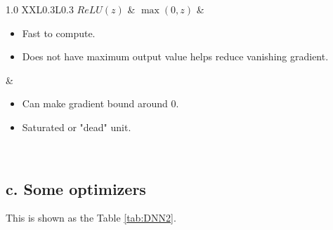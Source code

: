 \begin{table}[ht!]
\begin{tabularx}{1.0\textwidth}{ XXL{0.3\textwidth}L{0.3\textwidth} }
	$ReLU(z)$ & $\max(0, z)$ & 
	\begin{minipage}{\linewidth}\begin{itemize}[leftmargin=10pt, labelindent=0pt, itemindent=0pt, noitemsep]
		\item Fast to compute.
		\item Does not have maximum output value helps reduce vanishing gradient.
	\end{itemize}\end{minipage} & 
	\begin{minipage}{\linewidth}\begin{itemize}[leftmargin=10pt, labelindent=0pt, itemindent=0pt, noitemsep]
		\item Can make gradient bound around 0.
		\item Saturated or "dead" unit.
	\end{itemize}\end{minipage}\\
	
	\bottomrule
	\end{tabularx}
	
	\caption{Basic specifications of some common activation functions}
	\label{tab:DNN1}

\end{table}

\subsection*{c. Some optimizers}

This is shown as the Table \ref{tab:DNN2}.

